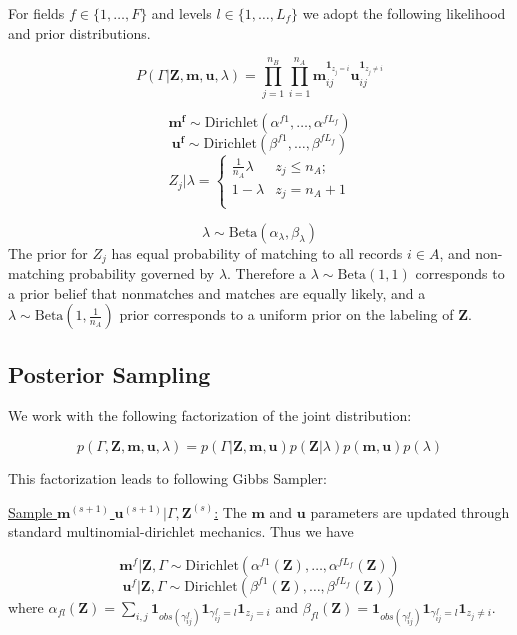 \documentclass[
  12pt,
]{article}
\begin{document}
For fields \(f \in \{1, \ldots, F\}\) and levels
\(l\in \{1, \ldots, L_f\}\) we adopt the following likelihood and prior
distributions.

\[P(\Gamma|\mathbf{Z}, \mathbf{m}, \mathbf{u}, \lambda) =\prod_{j=1}^{n_B}  \prod_{i=1}^{n_A}\mathbf{m}_{ij}^{\mathbf{1}_{z_j = i}}\mathbf{u}_{ij}^{\mathbf{1}_{z_j \neq i}}\]

\[\mathbf{m^{f}} \sim \text{Dirichlet}(\alpha^{f1}, \ldots, \alpha^{fL_f})\]
\[\mathbf{u^{f}} \sim \text{Dirichlet}(\beta^{f1}, \ldots, \beta^{fL_f})\]
\[Z_j | \lambda =
\begin{cases} 
    \frac{1}{n_A}\lambda  & z_j \leq n_A; \\
     1-\lambda &  z_j  = n_A + 1 \\
\end{cases}\]

\[\lambda \sim \text{Beta}(\alpha_{\lambda}, \beta_{\lambda}) \] The
prior for \(Z_j\) has equal probability of matching to all records
\(i\in A\), and non-matching probability governed by \(\lambda\).
Therefore a \(\lambda \sim \text{Beta}(1, 1)\) corresponds to a prior
belief that nonmatches and matches are equally likely, and a
\(\lambda \sim \text{Beta}(1, \frac{1}{n_A})\) prior corresponds to a
uniform prior on the labeling of \(\mathbf{Z}\).

\hypertarget{posterior-sampling}{%
\subsection{Posterior Sampling}\label{posterior-sampling}}

We work with the following factorization of the joint distribution:

\[p(\Gamma, \mathbf{Z}, \mathbf{m}, \mathbf{u}, \lambda) = p(\Gamma|\mathbf{Z}, \mathbf{m}, \mathbf{u}) p(\mathbf{Z} | \lambda) p(\mathbf{m}, \mathbf{u}) p(\lambda)\]

This factorization leads to following Gibbs Sampler:

\underline{Sample $\mathbf{m}^{(s+1)}$ $\mathbf{u}^{(s+1)}|\Gamma, \mathbf{Z}^{(s)}$:}
The \(\mathbf{m}\) and \(\mathbf{u}\) parameters are updated through
standard multinomial-dirichlet mechanics. Thus we have

\[\mathbf{m}^f|\mathbf{Z}, \Gamma \sim \text{Dirichlet}(\alpha^{f1}(\mathbf{Z}), \ldots, \alpha^{fL_f}(\mathbf{Z}))\]
\[\mathbf{u}^f|\mathbf{Z}, \Gamma \sim \text{Dirichlet}(\beta^{f1}(\mathbf{Z}), \ldots, \beta^{fL_f}(\mathbf{Z}))\]
where
\(\alpha_{fl}(\mathbf{Z})= \sum_{i,j} \mathbf{1}_{obs(\gamma_{ij}^f)}\mathbf{1}_{\gamma_{ij}^f = l} \mathbf{1}_{z_j = i}\)
and
\(\beta_{fl}(\mathbf{Z})= \mathbf{1}_{obs(\gamma_{ij}^f)}\mathbf{1}_{\gamma_{ij}^f = l} \mathbf{1}_{z_j \neq i}\).
\end{document}
